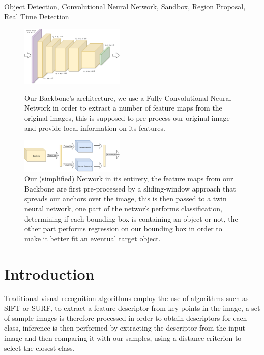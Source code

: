 \documentclass[10pt,journal,cspaper,compsoc]{IEEEtran}
\begin{document}
{%
\begin{IEEEkeywords}
 Object Detection, Convolutional Neural Network, Sandbox, Region Proposal, Real Time Detection
\end{IEEEkeywords}}

\maketitle
\IEEEpeerreviewmaketitle
    
\begin{figure}[h]
    
    \centering
    \includegraphics[width=0.44\textwidth]{images/backbone.pdf}
    \caption{Our Backbone's architecture, we use a Fully Convolutional Neural Network in order 
    to extract a number of feature maps from the original images, this is supposed to pre-process 
    our original image and provide local information on its features.}
    \label{fig:backbone}
    \includegraphics[width=0.44\textwidth]{images/network.pdf}
    \caption{Our (simplified) Network in its entirety, the feature maps from our Backbone are first 
    pre-processed by a sliding-window approach that spreads our anchors over the image, 
    this is then passed to a twin neural network, one part of the network performs classification,
    determining if each bounding box is containing an object or not, the other part performs regression on 
    our bounding box in order to make it better fit an eventual target object.}
    \label{fig:network}
\end{figure}

    \section{Introduction}
    Traditional visual recognition algorithms employ the use of algorithms such as SIFT 
    or SURF\cite{Lowe:SIFT,Bay:SURF}, to extract a feature descriptor from key points 
    in the image, a set of sample images is therefore processed in order to obtain descriptors 
    for each class, inference is then performed by extracting the descriptor from the input image 
    and then comparing it with our samples, using a distance criterion to select the closest class.
\end{document}
